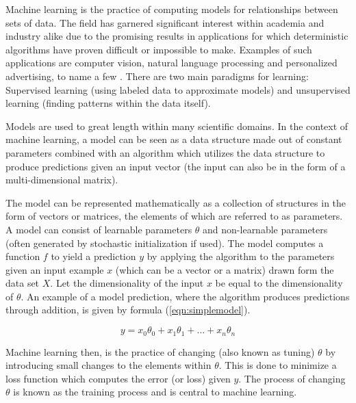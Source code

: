 Machine learning is the practice of computing models for relationships between sets of data. The field has garnered significant interest within academia and industry alike due to the promising results in applications for which deterministic algorithms have proven difficult or impossible to make. Examples of such applications are computer vision, natural language processing and personalized advertising, to name a few \cite{sebe2005machine, allen2003natural, malheiros2012too}. There are two main paradigms for learning: Supervised learning (using labeled data to approximate models) and unsupervised learning (finding patterns within the data itself). 

Models are used to great length within many scientific domains. In the context of machine learning, a model can be seen as a data structure made out of constant parameters combined with an algorithm which utilizes the data structure to produce predictions given an input vector (the input can also be in the form of a multi-dimensional matrix). 

The model can be represented mathematically as a collection of structures in the form of vectors or matrices, the elements of which are referred to as parameters. A model can consist of learnable parameters $\theta$ and non-learnable parameters (often generated by stochastic initialization if used). The model computes a function $f$ to yield a prediction $y$ by applying the algorithm to the parameters given an input example $x$ (which can be a vector or a matrix) drawn form the data set $X$. Let the dimensionality of the input $x$ be equal to the dimensionality of $\theta$. An example of a model prediction, where the algorithm produces predictions through addition, is given by formula (\ref{eqn:simplemodel}).

\begin{equation}
\label{eqn:simplemodel}
 y = x_0\theta_0 + x_1\theta_1 + ... + x_n\theta_n
\end{equation}

Machine learning then, is the practice of changing (also known as tuning) $\theta$ by introducing small changes to the elements within $\theta$. This is done to minimize a loss function which computes the error (or loss) given $y$. The process of changing $\theta$ is known as the training process and is central to machine learning. 

